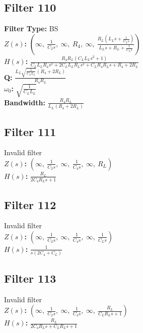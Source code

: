 \documentclass{article}
\begin{document}
\subsection*{Filter 110}
\textbf{Filter Type:} BS \\ 
\textbf{$Z(s)$:} $\left( \infty, \  \frac{1}{C_{2} s}, \  \infty, \  R_{4}, \  \infty, \  \frac{R_{L} \left(L_{L} s + \frac{1}{C_{L} s}\right)}{L_{L} s + R_{L} + \frac{1}{C_{L} s}}\right)$ \\ 
\textbf{$H(s)$:} $\frac{R_{4} R_{L} \left(C_{L} L_{L} s^{2} + 1\right)}{C_{L} L_{L} R_{4} s^{2} + 2 C_{L} L_{L} R_{L} s^{2} + C_{L} R_{4} R_{L} s + R_{4} + 2 R_{L}}$ \\ 
\textbf{Q:} $\frac{L_{L} \sqrt{\frac{1}{C_{L} L_{L}}} \left(R_{4} + 2 R_{L}\right)}{R_{4} R_{L}}$ \\ 
\textbf{$\omega_0$:} $\sqrt{\frac{1}{C_{L} L_{L}}}$ \\ 
\textbf{Bandwidth:} $\frac{R_{4} R_{L}}{L_{L} \left(R_{4} + 2 R_{L}\right)}$ \\ 
\subsection*{Filter 111}
Invalid filter \\ 
\textbf{$Z(s)$:} $\left( \infty, \  \frac{1}{C_{2} s}, \  \infty, \  \frac{1}{C_{4} s}, \  \infty, \  R_{L}\right)$ \\ 
\textbf{$H(s)$:} $\frac{R_{L}}{2 C_{4} R_{L} s + 1}$ \\ 
\subsection*{Filter 112}
Invalid filter \\ 
\textbf{$Z(s)$:} $\left( \infty, \  \frac{1}{C_{2} s}, \  \infty, \  \frac{1}{C_{4} s}, \  \infty, \  \frac{1}{C_{L} s}\right)$ \\ 
\textbf{$H(s)$:} $\frac{1}{s \left(2 C_{4} + C_{L}\right)}$ \\ 
\subsection*{Filter 113}
Invalid filter \\ 
\textbf{$Z(s)$:} $\left( \infty, \  \frac{1}{C_{2} s}, \  \infty, \  \frac{1}{C_{4} s}, \  \infty, \  \frac{R_{L}}{C_{L} R_{L} s + 1}\right)$ \\ 
\textbf{$H(s)$:} $\frac{R_{L}}{2 C_{4} R_{L} s + C_{L} R_{L} s + 1}$ \\ 
\end{document}

